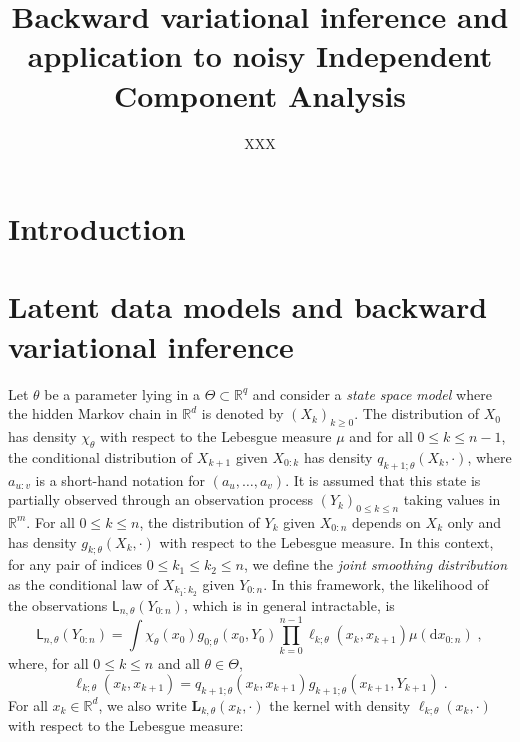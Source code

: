 \documentclass{article}
\title{Backward variational inference and application to noisy Independent Component Analysis}
\date{}
\author[$\dag$]{XXX}
\affil[$\dag$]{{\small }}
\newcommand{\1}{\mathbbm{1}}
\newcommand{\uk}[1]{\mathbf{L}_{#1}}
\newcommand{\md}[1]{g_{#1}}
\newcommand{\llh}[1]{\mathsf{L}_{#1}}
\newcommand{\parvec}{\theta}
\newcommand{\parspace}{\Theta}
\newcommand{\hd}[1]{q_{#1}}
\newcommand{\rset}{\ensuremath{\mathbb{R}}}
\newcommand{\rmd}{\ensuremath{\mathrm{d}}}
\newcommand{\eqsp}{\;}
\newcommand{\qg}[1]{\ell_{#1}}
\begin{document}
\maketitle

\begin{abstract}

\end{abstract}

\section{Introduction}

\section{Latent data models and backward variational inference}
Let $\parvec$ be a parameter lying in a $\Theta\subset \rset^q$ and consider a  \textit{state space model} where the hidden Markov chain  in $\rset^d$ is denoted by $(X_k)_{k\geqslant 0}$. The distribution of $X_0$ has density $\chi_\theta$ with respect to the Lebesgue measure $\mu$ and for all $0\leqslant k \leqslant n-1$, the conditional distribution of $X_{k+1} $ given $X_{0:k}$ has density $\hd{k+1;\parvec}(X_{k},\cdot)$, where $a_{u:v}$ is a short-hand notation for $(a_u,\ldots,a_v)$. 
It is assumed that this state  is partially observed  through an observation process $(Y_k)_{0\leqslant k \leqslant n}$ taking values in $\rset^m$. 
For all $0\leqslant k \leqslant n$, the distribution of $Y_k$ given $X_{0:n}$ depends on $X_k$ only and has density $\md{k;\parvec}(X_k,\cdot)$ with respect to the Lebesgue measure. 
In this context, for any pair of indices $0\leqslant k_1 \leqslant k_2 \leqslant n$, we define the \textit{joint smoothing distribution} as the conditional law of $X_{k_1:k_2}$ given $Y_{0:n}$. 
In this framework, the likelihood of the observations $\llh{n,\parvec}(Y_{0:n})$, which is  in general intractable, is
$$
\llh{n,\parvec}(Y_{0:n})  = \int \chi_\theta(x_0)\md{0;\parvec}(x_{0},Y_{0})\prod_{k=0}^{n-1}\qg{k;\parvec}(x_{k},x_{k+1})\mu(\rmd x_{0:n})\eqsp,
$$
 where, for all $0\leqslant k \leqslant n$ and all $\parvec\in\parspace$,
\begin{equation}
\label{eq:def:elln}
\qg{k;\parvec}(x_{k},x_{k+1}) = \hd{k+1;\parvec}(x_{k}, x_{k+1})\md{k+1;\parvec}(x_{k+1},Y_{k+1})\eqsp.
\end{equation}
For all $x_k\in\mathbb{R}^d$, we also write $\uk{k,\theta}(x_k, \cdot)$ the kernel with density $\qg{k;\parvec}(x_{k},\cdot) $ with respect to the Lebesgue measure:
\end{document}
